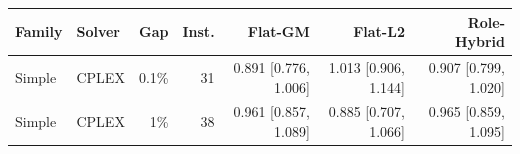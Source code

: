 \begin{tabular}{llrrrrr}
\toprule
Family & Solver & Gap & Inst. & Flat-GM & Flat-L2 & Role-Hybrid \\
\midrule
Simple & CPLEX & 0.1\% & 31 & 0.891 [0.776, 1.006] & 1.013 [0.906, 1.144] & 0.907 [0.799, 1.020] \\
Simple & CPLEX & 1\% & 38 & 0.961 [0.857, 1.089] & 0.885 [0.707, 1.066] & 0.965 [0.859, 1.095] \\
\bottomrule
\end{tabular}
